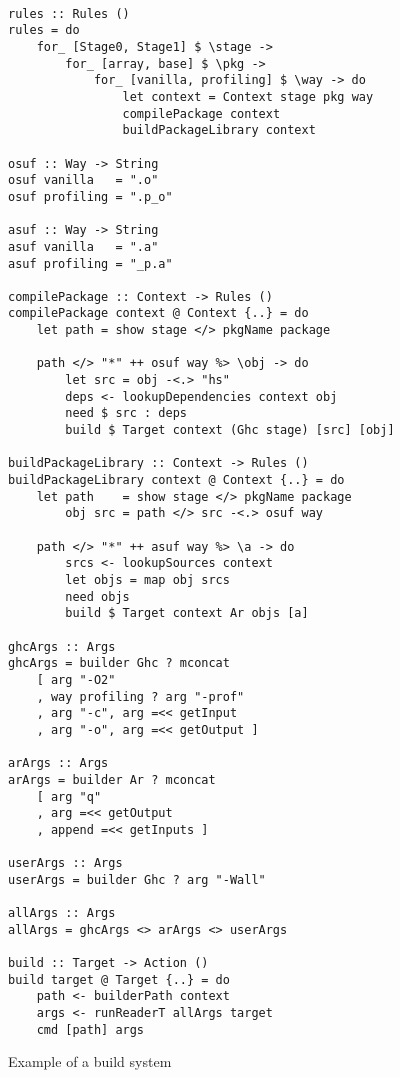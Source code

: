 \begin{figure}
\begin{lstlisting}[basicstyle=\ttfamily]

rules :: Rules ()
rules = do
    for_ [Stage0, Stage1] $ \stage ->
        for_ [array, base] $ \pkg ->
            for_ [vanilla, profiling] $ \way -> do
                let context = Context stage pkg way
                compilePackage context
                buildPackageLibrary context

osuf :: Way -> String
osuf vanilla   = ".o"
osuf profiling = ".p_o"

asuf :: Way -> String
asuf vanilla   = ".a"
asuf profiling = "_p.a"

compilePackage :: Context -> Rules ()
compilePackage context @ Context {..} = do
    let path = show stage </> pkgName package

    path </> "*" ++ osuf way %> \obj -> do
        let src = obj -<.> "hs"
        deps <- lookupDependencies context obj
        need $ src : deps
        build $ Target context (Ghc stage) [src] [obj]

buildPackageLibrary :: Context -> Rules ()
buildPackageLibrary context @ Context {..} = do
    let path    = show stage </> pkgName package
        obj src = path </> src -<.> osuf way

    path </> "*" ++ asuf way %> \a -> do
        srcs <- lookupSources context
        let objs = map obj srcs
        need objs
        build $ Target context Ar objs [a]

ghcArgs :: Args
ghcArgs = builder Ghc ? mconcat
    [ arg "-O2"
    , way profiling ? arg "-prof"
    , arg "-c", arg =<< getInput
    , arg "-o", arg =<< getOutput ]

arArgs :: Args
arArgs = builder Ar ? mconcat
    [ arg "q"
    , arg =<< getOutput
    , append =<< getInputs ]

userArgs :: Args
userArgs = builder Ghc ? arg "-Wall"

allArgs :: Args
allArgs = ghcArgs <> arArgs <> userArgs

build :: Target -> Action ()
build target @ Target {..} = do
    path <- builderPath context
    args <- runReaderT allArgs target
    cmd [path] args
\end{lstlisting}
\caption{Example of a build system\label{fig:example-abstractions}}
\end{figure}
